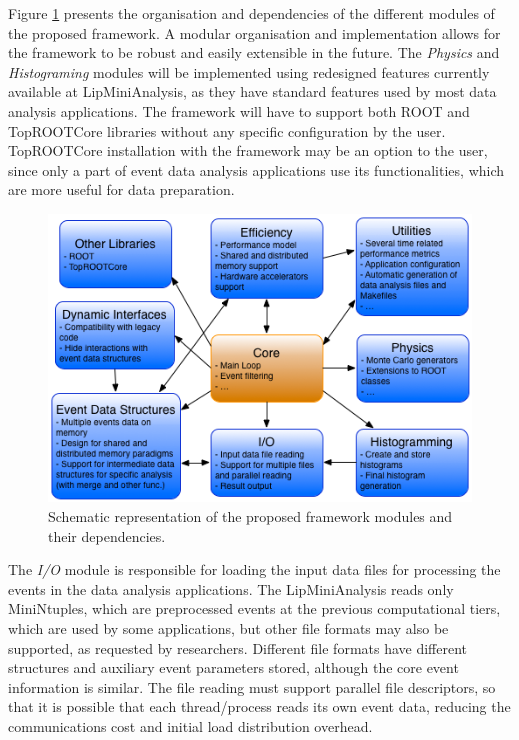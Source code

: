 Figure \ref{fig:new_framework} presents the organisation and dependencies of the different modules of the proposed framework. A modular organisation and implementation allows for the framework to be robust and easily extensible in the future. The \textit{Physics} and \textit{Histograming} modules will be implemented using redesigned features currently available at LipMiniAnalysis, as they have standard features used by most data analysis applications. The framework will have to support both ROOT and TopROOTCore libraries without any specific configuration by the user. TopROOTCore installation with the framework may be an option to the user, since only a part of event data analysis applications use its functionalities, which are more useful for data preparation.

\begin{figure}[!htp]
	\begin{center}
		\includegraphics[scale=0.7]{imgs/new_framework.png}
		\caption{Schematic representation of the proposed framework modules and their dependencies.}
		\label{fig:new_framework}
	\end{center}
\end{figure}

The \textit{I/O} module is responsible for loading the input data files for processing the events in the data analysis applications. The LipMiniAnalysis reads only MiniNtuples, which are preprocessed events at the previous computational tiers, which are used by some applications, but other file formats may also be supported, as requested by researchers. Different file formats have different structures and auxiliary event parameters stored, although the core event information is similar. The file reading must support parallel file descriptors, so that it is possible that each thread/process reads its own event data, reducing the communications cost and initial load distribution overhead.

